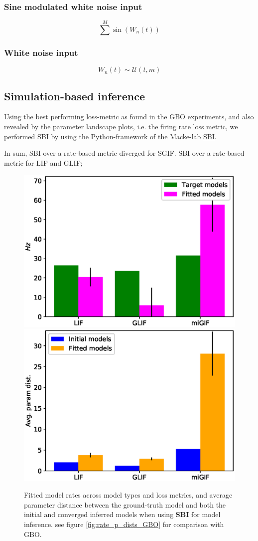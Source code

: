\documentclass[mphil,deptreport,ianc]{infthesis} %
\begin{document}
\subsubsection*{Sine modulated white noise input}

\begin{equation}
    \sum^M \sin(W_n(t))
\end{equation}

\subsubsection*{White noise input}

\begin{equation}
    W_n(t) \sim \mathcal{U}(t, m)
\end{equation}



\subsection{Simulation-based inference}

Using the best performing loss-metric as found in the GBO experiments, and also revealed by the parameter landscape plots, i.e. the firing rate loss metric, we performed SBI by using the Python-framework of the Macke-lab \href{https://github.com/mackelab/sbi}{SBI}.

In sum, SBI over a rate-based metric diverged for SGIF.
SBI over a rate-based metric for LIF and GLIF; 

\begin{figure}
    \centering
	\includegraphics[width=0.49\columnwidth]{figures/sbi_plot_rates_all.eps}
	\includegraphics[width=0.49\columnwidth]{figures/sbi_mean_p_dist_all.eps}
	\caption{Fitted model rates across model types and loss metrics, and average parameter distance between the ground-truth model and both the initial and converged inferred models when using \textbf{SBI} for model inference. see figure \ref{fig:rate_p_dists_GBO} for comparison with GBO.}
	\label{fig:rate_p_dists_SBI}
\end{figure}
\end{document}
